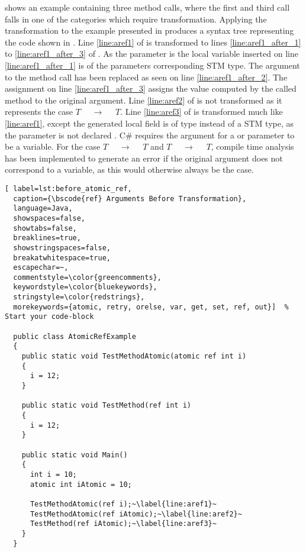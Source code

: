  shows an example containing three method calls, where the first and third call falls in one of the categories which require transformation. Applying the transformation to the example presented in  produces a syntax tree representing the code shown in . Line \ref{line:aref1} of  is transformed to lines \ref{line:aref1_after_1} to \ref{line:aref1_after_3} of . As the parameter is  the local variable inserted on line \ref{line:aref1_after_1} is of the parameters corresponding \ac{STM} type. The argument to the method call has been replaced as seen on line \ref{line:aref1_after_2}. The assignment on line \ref{line:aref1_after_3} assigns the value computed by the called method to the original argument. Line \ref{line:aref2} of  is not transformed as it represents the case  $T$ $\quad \rightarrow \quad$  $T$. Line \ref{line:aref3} of  is transformed much like \ref{line:aref1}, except the generated local field is of type  instead of a \ac{STM} type, as the parameter is not declared . C\# requires the argument for a  or  parameter to be a variable. For the case $T$ $\quad \rightarrow \quad$  $T$ and  $T$ $\quad \rightarrow \quad$ $T$,  compile time analysis has been implemented to generate an error if the original argument does not correspond to a variable, as this would otherwise always be the case.


\begin{lstlisting}[ label=lst:before_atomic_ref,
  caption={\bscode{ref} Arguments Before Transformation},
  language=Java,  
  showspaces=false,
  showtabs=false,
  breaklines=true,
  showstringspaces=false,
  breakatwhitespace=true,
  escapechar=~,
  commentstyle=\color{greencomments},
  keywordstyle=\color{bluekeywords},
  stringstyle=\color{redstrings},
  morekeywords={atomic, retry, orelse, var, get, set, ref, out}]  % Start your code-block

  public class AtomicRefExample
  {
    public static void TestMethodAtomic(atomic ref int i)
    {
      i = 12;
    }

    public static void TestMethod(ref int i)
    {
      i = 12;
    }

    public static void Main()
    {
      int i = 10;
      atomic int iAtomic = 10;

      TestMethodAtomic(ref i);~\label{line:aref1}~
      TestMethodAtomic(ref iAtomic);~\label{line:aref2}~
      TestMethod(ref iAtomic);~\label{line:aref3}~
    }
  }
\end{lstlisting}


